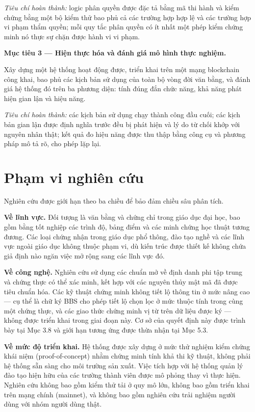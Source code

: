 \textit{Tiêu chí hoàn thành:} logic phân quyền được đặc tả bằng mã thi hành và kiểm chứng bằng một bộ kiểm thử bao phủ cả các trường hợp hợp lệ và các trường hợp vi phạm thẩm quyền; mỗi quy tắc phân quyền có ít nhất một phép kiểm chứng minh nó thực sự chặn được hành vi vi phạm.

\noindent \textbf{Mục tiêu 3 --- Hiện thực hóa và đánh giá mô hình thực nghiệm.}

Xây dựng một hệ thống hoạt động được, triển khai trên một mạng blockchain công khai, bao phủ các kịch bản sử dụng của toàn bộ vòng đời văn bằng, và đánh giá hệ thống đó trên ba phương diện: tính đúng đắn chức năng, khả năng phát hiện gian lận và hiệu năng.

\textit{Tiêu chí hoàn thành:} các kịch bản sử dụng chạy thành công đầu cuối; các kịch bản gian lận được định nghĩa trước đều bị phát hiện và lý do từ chối khớp với nguyên nhân thật; kết quả đo hiệu năng được thu thập bằng công cụ và phương pháp mô tả rõ, cho phép lặp lại.

\section{Phạm vi nghiên cứu}

Nghiên cứu được giới hạn theo ba chiều để bảo đảm chiều sâu phân tích.

\noindent \textbf{Về lĩnh vực.} Đối tượng là văn bằng và chứng chỉ trong giáo dục đại học, bao gồm bằng tốt nghiệp các trình độ, bảng điểm và các minh chứng học thuật tương đương. Các loại chứng nhận trong giáo dục phổ thông, đào tạo nghề và các lĩnh vực ngoài giáo dục không thuộc phạm vi, dù kiến trúc được thiết kế không chứa giả định nào ngăn việc mở rộng sang các lĩnh vực đó.

\noindent \textbf{Về công nghệ.} Nghiên cứu sử dụng các chuẩn mở về định danh phi tập trung và chứng thực có thể xác minh, kết hợp với các nguyên thủy mật mã đã được tiêu chuẩn hóa. Các kỹ thuật chứng minh không tiết lộ thông tin ở mức nâng cao --- cụ thể là chữ ký BBS cho phép tiết lộ chọn lọc ở mức thuộc tính trong cùng một chứng thực, và các giao thức chứng minh vị từ trên dữ liệu được ký --- không được triển khai trong giai đoạn này. Cơ sở của quyết định này được trình bày tại Mục 3.8 và giới hạn tương ứng được thừa nhận tại Mục 5.3.

\noindent \textbf{Về mức độ triển khai.} Hệ thống được xây dựng ở mức thử nghiệm kiểm chứng khái niệm (proof-of-concept) nhằm chứng minh tính khả thi kỹ thuật, không phải hệ thống sẵn sàng cho môi trường sản xuất. Việc tích hợp với hệ thống quản lý đào tạo hiện hữu của các trường thành viên được mô phỏng thay vì thực hiện. Nghiên cứu không bao gồm kiểm thử tải ở quy mô lớn, không bao gồm triển khai trên mạng chính (mainnet), và không bao gồm nghiên cứu trải nghiệm người dùng với nhóm người dùng thật.

